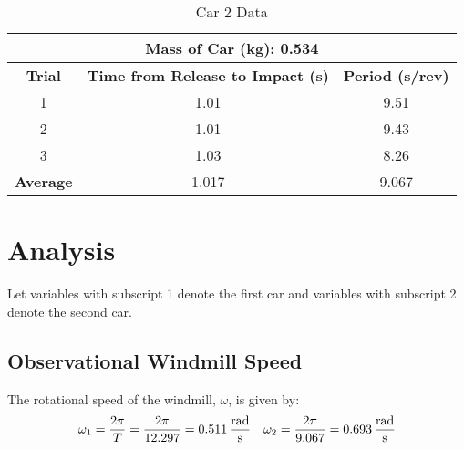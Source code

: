 \documentclass[article, 12pt]{article}
\begin{document}
        \begin{table}[H]
            \centering
            \begin{tabular}{|c|c|c|}
                \hline
                \multicolumn{3}{|c|}{\textbf{Mass of Car (kg): 0.534}} \\
                \hline
                \textbf{Trial} & \textbf{Time from Release to Impact (s)} & \textbf{Period (s/rev)} \\
                \hline
                1 & 1.01 & 9.51 \\
                2 & 1.01 & 9.43 \\
                3 & 1.03 & 8.26 \\
                \hline
                \textbf{Average} & 1.017 & 9.067 \\
                \hline
            \end{tabular}
            \caption{Car 2 Data}\label{tab:car2} 
        \end{table}
    \section{Analysis}
    Let variables with subscript 1 denote the first car and variables with subscript 2 denote the second car.
    \subsection{Observational Windmill Speed}
    The rotational speed of the windmill, $\omega$, is given by:
    \begin{align}
        \omega_1 = \frac{2\pi}{T} = \frac{2\pi}{12.297} = \text{\SI{0.511}{\frac{\radian}{\second}}} && \omega_2 = \frac{2\pi}{9.067} = \text{\SI{0.693}{\frac{\radian}{\second}}}\label{eq:windmillSpeedObservational}
    \end{align}
\end{document}

